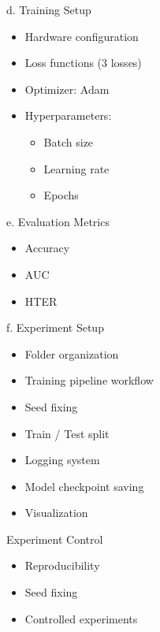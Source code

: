 \begin{frame}{d. Training Setup}
\begin{itemize}
    \item Hardware configuration
    \item Loss functions (3 losses)
    \item Optimizer: Adam
    \item Hyperparameters:
    \begin{itemize}
        \item Batch size
        \item Learning rate
        \item Epochs
    \end{itemize}
\end{itemize}
\end{frame}

\begin{frame}{e. Evaluation Metrics}
\begin{itemize}
    \item Accuracy
    \item AUC
    \item HTER
\end{itemize}
\end{frame}

\begin{frame}{f. Experiment Setup}
\begin{itemize}
    \item Folder organization
    \item Training pipeline workflow
    \item Seed fixing
    \item Train / Test split
    \item Logging system
    \item Model checkpoint saving
    \item Visualization
\end{itemize}
\end{frame}

\begin{frame}{Experiment Control}
\begin{itemize}
    \item Reproducibility
    \item Seed fixing
    \item Controlled experiments
\end{itemize}
\end{frame}

